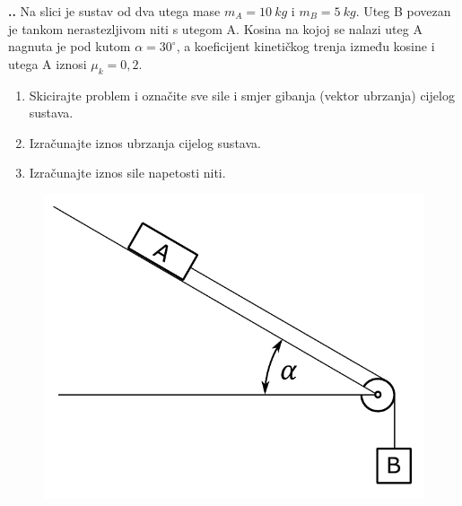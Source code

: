 

\noindent 
\textbf{
\thecjelina.\thezadatak.}
Na slici  je sustav od dva utega mase $m_A=10\ kg$ i $m_B=5\ kg$. Uteg B povezan je tankom nerastezljivom niti s utegom A. 
Kosina na kojoj se nalazi uteg A nagnuta je pod kutom $\alpha=30^\circ$, a koeficijent kinetičkog trenja između kosine i utega A iznosi $\mu_k=0,2$.
\begin{enumerate}[label=\alph*)]
 \item Skicirajte problem i označite sve sile i smjer gibanja (vektor ubrzanja) cijelog sustava.
 \item Izračunajte iznos ubrzanja cijelog sustava.
 \item Izračunajte iznos sile napetosti niti.
\end{enumerate}

\begin{figure}[ht]%
  \begin{center}
    \includegraphics[scale=0.25]{../03_Dinamika_materijalne_tocke/Zadatak_D701.png}
  \end{center}
\end{figure}
